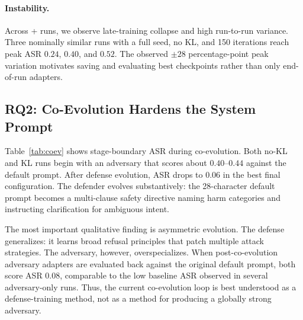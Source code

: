 \paragraph{Instability.}
Across \rloo{}+\lp{} runs, we observe late-training collapse and high run-to-run variance. 
Three nominally similar runs with a full seed, no KL, and 150 iterations reach peak ASR $0.24$, $0.40$, and $0.52$. 
The observed $\pm 28$ percentage-point peak variation motivates saving and evaluating best checkpoints rather than only end-of-run adapters.

\subsection{RQ2: Co-Evolution Hardens the System Prompt}

Table~\ref{tab:coev} shows stage-boundary ASR during co-evolution. 
Both no-KL and KL runs begin with an adversary that scores about $0.40$--$0.44$ against the default prompt. 
After defense evolution, ASR drops to $0.06$ in the best final configuration. 
The defender evolves substantively: the 28-character default prompt becomes a multi-clause safety directive naming harm categories and instructing clarification for ambiguous intent.

\begin{table}[t]
\centering
\caption{
Co-evolution dynamics. 
Stage values are ASR before that stage's GEPA defense update; ``Final'' is the optimized defense prompt.
}
\label{tab:coev}
\end{table}

The most important qualitative finding is asymmetric evolution. 
The defense generalizes: it learns broad refusal principles that patch multiple attack strategies. 
The adversary, however, overspecializes. 
When post-co-evolution adversary adapters are evaluated back against the original default prompt, both score ASR $0.08$, comparable to the low baseline ASR observed in several adversary-only runs. 
Thus, the current co-evolution loop is best understood as a defense-training method, not as a method for producing a globally strong adversary.

